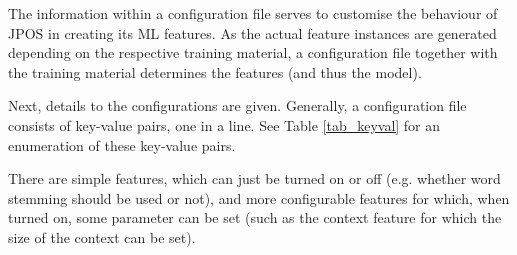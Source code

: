 \documentclass[11pt,a4paper,halfparskip]{scrartcl}
\begin{document}
The information within a configuration file serves to customise the
behaviour of JPOS in creating its ML features. As the actual feature
instances are generated depending on the respective training material,
a configuration file together with the training material determines
the features (and thus the model).

Next, details to the configurations are given.  Generally, a
configuration file consists of key-value pairs, one in a line. See
Table \ref{tab_keyval} for an enumeration of these key-value pairs.

There are simple features, which can just be turned on or off (e.g.
whether word stemming should be used or not), and more configurable
features for which, when turned on, some parameter can be set (such as
the context feature for which the size of the context can be set).


\end{document}

